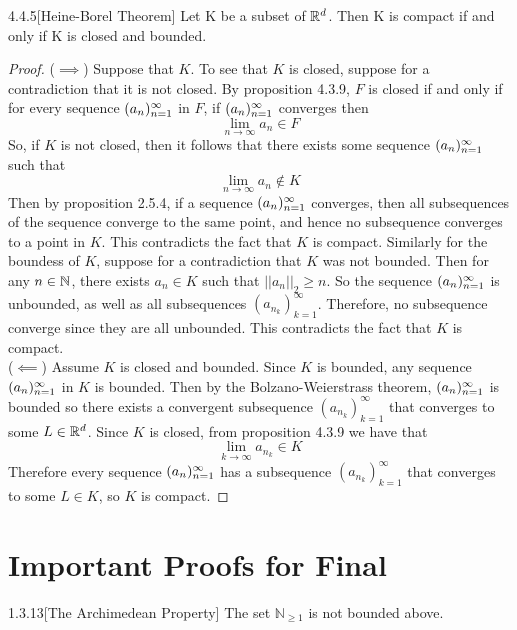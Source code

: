 \documentclass[openany]{report}
\begin{document}
\begin{manualtheorem}{4.4.5}[Heine-Borel Theorem]
    Let K be a subset of $\mathbb{R}^d$. Then K is compact if and only if K is closed and bounded.
\end{manualtheorem}
\begin{proof}
   ($\implies$) Suppose that $K$. To see that $K$ is closed, suppose for a contradiction that it is not closed. By proposition 4.3.9, $F$ is closed if and only if for every sequence $({a}_n)_{n=1}^\infty$ in $F$, if $({a}_n)_{n=1}^\infty$ converges then 
   \[\lim_{n\rightarrow \infty} a_n \in F\]
   So, if $K$ is not closed, then it follows that there exists some sequence $({a}_n)_{n=1}^\infty$ such that 
   \[\lim_{n\rightarrow\infty} a_n \not\in K\]
   Then by proposition 2.5.4, if a sequence $({a}_n)_{n=1}^\infty$ converges, then all subsequences of the sequence converge to the same point, and hence no subsequence converges to a point in $K$. This contradicts the fact that $K$ is compact. Similarly for the boundess of $K$, suppose for a contradiction that $K$ was not bounded. Then for any $n \in \mathbb{N}$, there exists $a_n \in K$ such that $||a_n||_2 \geq n$. So the sequence $({a}_n)_{n=1}^\infty$ is unbounded, as well as all subsequences $(a_{n_k})^\infty_{k=1}$. Therefore, no subsequence converge since they are all unbounded. This contradicts the fact that $K$ is compact.\\[2ex]
   ($\impliedby$) Assume $K$ is closed and bounded. Since $K$ is bounded, any sequence $({a}_n)_{n=1}^\infty$ in $K$ is bounded. Then by the Bolzano-Weierstrass theorem, $({a}_n)_{n=1}^\infty$ is bounded so there exists a convergent subsequence $(a_{n_k})_{k=1}^\infty$ that converges to some $L \in \mathbb{R}^d$. Since $K$ is closed, from proposition 4.3.9 we have that 
   \[\lim_{k\rightarrow\infty} a_{n_k} \in K\]
   Therefore every sequence $({a}_n)_{n=1}^\infty$ has a subsequence $(a_{n_k})_{k=1}^\infty$ that converges to some $L \in K$, so $K$ is compact.
\end{proof}
    
\chapter*{Important Proofs for Final}
\label{chapter:final}


\begin{manualtheorem}{1.3.13}[The Archimedean Property]
    The set $\mathbb{N}_{\geq1}$ is not bounded above.
\end{manualtheorem}
    
\end{document}
